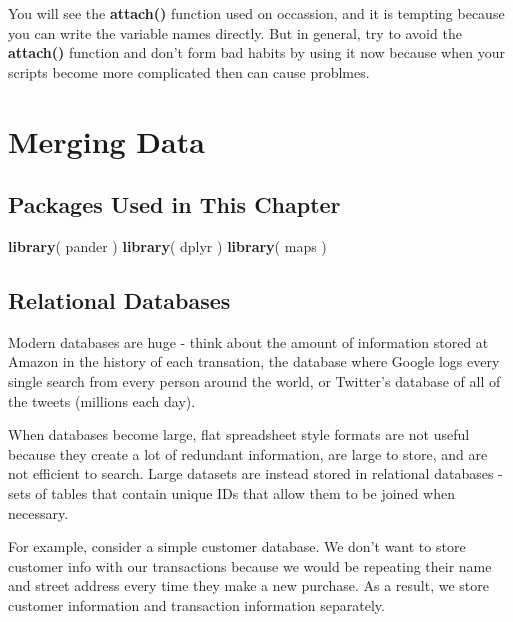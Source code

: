 \documentclass[]{book}
\newenvironment{Shaded}{\begin{snugshade}}{\end{snugshade}}
\newcommand{\KeywordTok}[1]{\textcolor[rgb]{0.13,0.29,0.53}{\textbf{#1}}}
\newcommand{\NormalTok}[1]{#1}
\theoremstyle{definition}
\theoremstyle{definition}
\theoremstyle{definition}
\theoremstyle{remark}
\begin{document}
You will see the \textbf{attach()} function used on occassion, and it is
tempting because you can write the variable names directly. But in
general, try to avoid the \textbf{attach()} function and don't form bad
habits by using it now because when your scripts become more complicated
then can cause problmes.

\hypertarget{merging-data}{%
\chapter{Merging Data}\label{merging-data}}

\hypertarget{packages-used-in-this-chapter}{%
\section{Packages Used in This
Chapter}\label{packages-used-in-this-chapter}}

\begin{Shaded}
\begin{Highlighting}[]
\KeywordTok{library}\NormalTok{( pander )}
\KeywordTok{library}\NormalTok{( dplyr )}
\KeywordTok{library}\NormalTok{( maps )}
\end{Highlighting}
\end{Shaded}

\hypertarget{relational-databases}{%
\section{Relational Databases}\label{relational-databases}}

Modern databases are huge - think about the amount of information stored
at Amazon in the history of each transation, the database where Google
logs every single search from every person around the world, or
Twitter's database of all of the tweets (millions each day).

When databases become large, flat spreadsheet style formats are not
useful because they create a lot of redundant information, are large to
store, and are not efficient to search. Large datasets are instead
stored in relational databases - sets of tables that contain unique IDs
that allow them to be joined when necessary.

For example, consider a simple customer database. We don't want to store
customer info with our transactions because we would be repeating their
name and street address every time they make a new purchase. As a
result, we store customer information and transaction information
separately.
\end{document}
